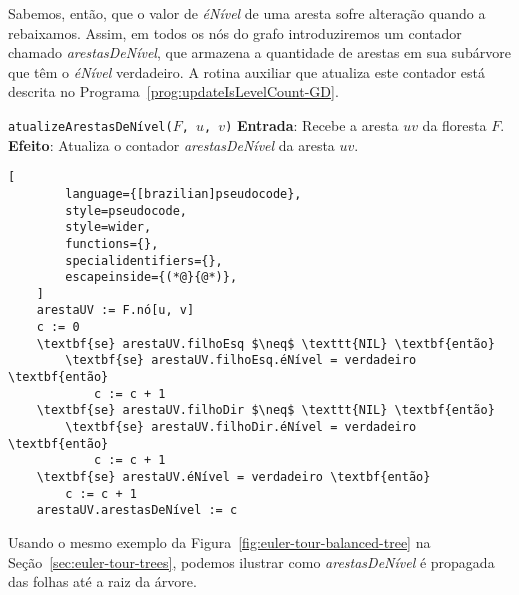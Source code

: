 Sabemos, então, que o valor de \textit{éNível} de uma aresta sofre alteração quando a rebaixamos. Assim, em todos os nós do grafo introduziremos um contador chamado \textit{arestasDeNível}, que armazena a quantidade de arestas em sua subárvore que têm o \textit{éNível} verdadeiro. A rotina auxiliar que atualiza este contador está descrita no Programa~\ref{prog:updateIsLevelCount-GD}.

\begin{programruledcaption}{\texttt{atualizeArestasDeNível($F$, $u$, $v$)} \label{prog:updateIsLevelCount-GD}}
    \noindent\textbf{Entrada}: Recebe a aresta $uv$ da floresta $F$.\\
    \noindent\textbf{Efeito}: Atualiza o contador \textit{arestasDeNível} da aresta $uv$.
    \vspace{-0.5\baselineskip}
    \begin{lstlisting}[
        language={[brazilian]pseudocode},
        style=pseudocode,
        style=wider,
        functions={},
        specialidentifiers={},
        escapeinside={(*@}{@*)},
    ]
    arestaUV := F.nó[u, v]
    c := 0
    \textbf{se} arestaUV.filhoEsq $\neq$ \texttt{NIL} \textbf{então}
        \textbf{se} arestaUV.filhoEsq.éNível = verdadeiro \textbf{então}
            c := c + 1
    \textbf{se} arestaUV.filhoDir $\neq$ \texttt{NIL} \textbf{então}
        \textbf{se} arestaUV.filhoDir.éNível = verdadeiro \textbf{então}
            c := c + 1
    \textbf{se} arestaUV.éNível = verdadeiro \textbf{então}
        c := c + 1
    arestaUV.arestasDeNível := c
\end{lstlisting}
\vspace{-0.5\baselineskip}
\end{programruledcaption}

Usando o mesmo exemplo da Figura~\ref{fig:euler-tour-balanced-tree} na Seção~\ref{sec:euler-tour-trees}, podemos ilustrar como \textit{arestasDeNível} é propagada das folhas até a raiz da árvore.

